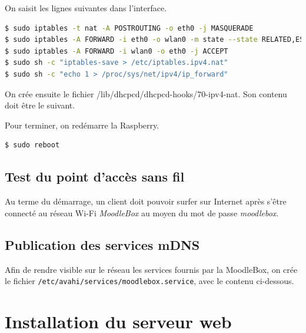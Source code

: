\documentclass[11pt]{article}
\begin{document}

On saisit les lignes suivantes dans l'interface.

\begin{lstlisting}[language=bash]
$ sudo iptables -t nat -A POSTROUTING -o eth0 -j MASQUERADE
$ sudo iptables -A FORWARD -i eth0 -o wlan0 -m state --state RELATED,ESTABLISHED -j ACCEPT
$ sudo iptables -A FORWARD -i wlan0 -o eth0 -j ACCEPT
$ sudo sh -c "iptables-save > /etc/iptables.ipv4.nat"
$ sudo sh -c "echo 1 > /proc/sys/net/ipv4/ip_forward"
\end{lstlisting}

On crée ensuite le fichier {/lib/dhcpcd/dhcpcd-hooks/70-ipv4-nat}.
Son contenu doit être le suivant.



Pour terminer, on redémarre la Raspberry.

\begin{lstlisting}[language=bash]
$ sudo reboot
\end{lstlisting}

\subsection{Test du point d'accès sans fil}

\begin{verification}
Au terme du démarrage, un client doit pouvoir surfer sur Internet après s'être connecté au réseau Wi-Fi \emph{MoodleBox} au moyen du mot de passe \emph{moodlebox}.
\end{verification}

\subsection{Publication des services mDNS}

Afin de rendre visible sur le réseau les services fournis par la MoodleBox, on crée le fichier \lstinline{/etc/avahi/services/moodlebox.service}, avec le contenu ci-dessous.


\section{Installation du serveur web}
\end{document}
